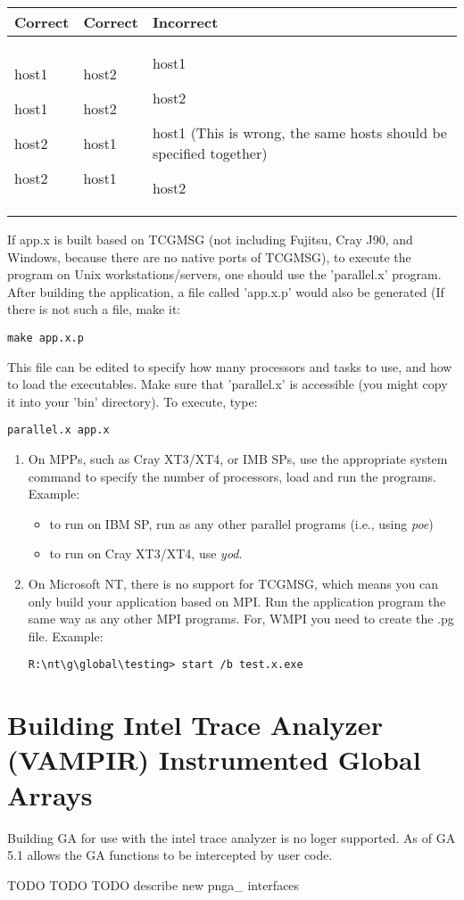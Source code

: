 \begin{tabular}{|>{\centering}p{2cm}|>{\centering}p{2cm}|>{\raggedright}p{3cm}|}
\hline 
Correct & Correct & Incorrect\tabularnewline
\hline
\hline 
host1

host1

host2

host2 & host2

host2

host1

host1 & host1

host2

host1 (This is wrong, the same hosts should be specified together)

host2\tabularnewline
\hline
\end{tabular}

If app.x is built based on TCGMSG (not including Fujitsu, Cray J90, and
Windows, because there are no native ports of TCGMSG), to execute the program
on Unix workstations/servers, one should use the 'parallel.x' program. After
building the application, a file called 'app.x.p' would also be generated (If
there is not such a file, make it: 
\begin{verbatim}
make app.x.p
\end{verbatim}
This file can be edited to specify how many processors and tasks to use, and
how to load the executables. Make sure that 'parallel.x' is accessible (you
might copy it into your 'bin' directory). To execute, type:
\begin{verbatim}
parallel.x app.x
\end{verbatim}

\begin{enumerate}

\item On MPPs, such as Cray XT3/XT4, or IMB SPs, use the appropriate system
command to specify the number of processors, load and run the programs.
Example: 
\begin{itemize}
\item to run on IBM SP, run as any other parallel programs (i.e., using
\emph{poe}) 
\item to run on Cray XT3/XT4, use \emph{yod}.
\end{itemize}

\item On Microsoft NT, there is no support for TCGMSG, which means you can only
build your application based on MPI. Run the application program the same way
as any other MPI programs. For, WMPI you need to create the .pg file. Example:
\begin{verbatim}
R:\nt\g\global\testing> start /b test.x.exe
\end{verbatim}
\end{enumerate}

\section{Building Intel Trace Analyzer (VAMPIR) Instrumented Global Arrays}

Building GA for use with the intel trace analyzer is no loger supported. As of
GA 5.1 allows the GA functions to be intercepted by user code.

TODO TODO TODO describe new pnga\_ interfaces
